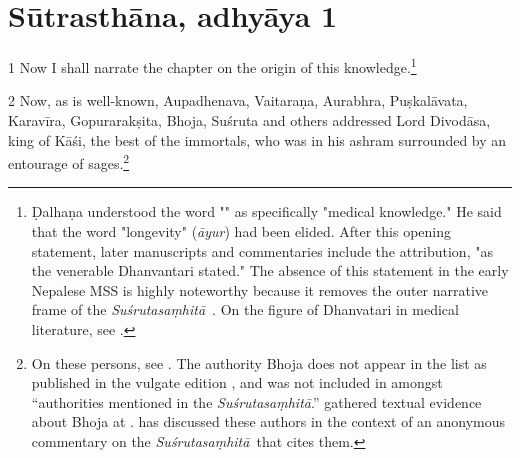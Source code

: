 \documentclass[12pt]{article}
\renewcommand{\SS}{\emph{Suśrutasaṃhitā}}
\begin{document}
    \section{Sūtrasthāna, adhyāya 1}
    
\begin{translation}

    \item[1] Now I shall narrate the chapter on the origin of this
knowledge.\footnote{Ḍalhaṇa understood the word "" as
specifically "medical knowledge." He said that the word "longevity"
(\emph{āyur})  had been elided.
%    
%    
%    
After this opening statement, later manuscripts and commentaries include
the attribution, "as the venerable Dhanvantari stated."  The absence of this
statement in the early Nepalese MSS is highly noteworthy because it removes
the outer narrative frame of the \SS\
\parencites[148]{wuja-2013}[\S\,3.1.2]{kleb-2021b}.  On the figure of Dhanvatari in 
medical literature, see \cite[IA 358--361]{meul-hist}.} %
    
    \item[2] Now, as is well-known, Aupadhenava, Vaitaraṇa, Aurabhra, Puṣkalāvata,
Karavīra, Gopurarakṣita, Bhoja, Suśruta and others addressed Lord Divodāsa,
king of Kāśi, the best of the immortals, who was in his ashram surrounded by
an entourage of sages.\footnote{On these persons, see \cite[IA
361--363, 369\,ff.]{meul-hist}. The authority Bhoja does not appear in the list as
published in the vulgate edition \citep[1]{susr-trikamji2}, and was not
included in \cite{meul-hist} amongst “authorities mentioned in the \SS.” 
\citeauthor{meul-hist} gathered textual evidence about Bhoja at \cite[IA
690--691]{meul-hist}. \citet{kleb-2021a} has discussed these authors in the
context of an anonymous commentary on the \SS\ that cites them.}

\nocite{emen-1969}
    
    

\end{translation}
\end{document}

